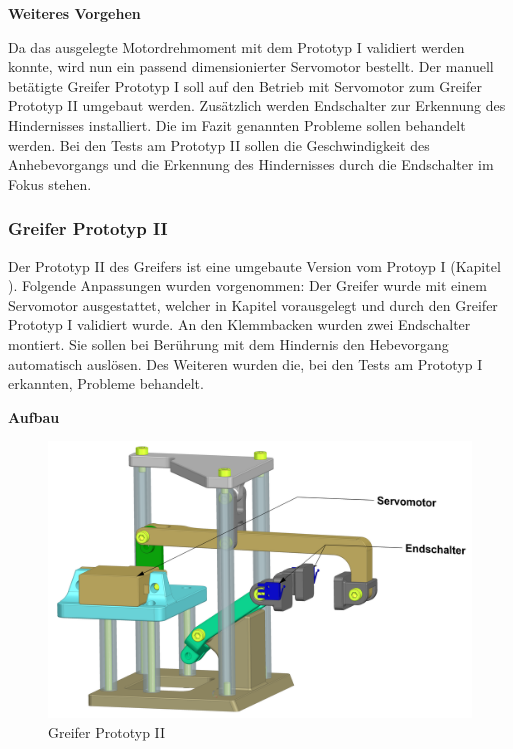 \textbf{Weiteres Vorgehen}

Da das ausgelegte Motordrehmoment mit dem Prototyp I validiert werden konnte, wird nun ein passend dimensionierter Servomotor bestellt. Der manuell betätigte Greifer Prototyp I soll auf den Betrieb mit Servomotor zum Greifer Prototyp II umgebaut werden. Zusätzlich werden Endschalter zur Erkennung des Hindernisses installiert. Die im Fazit genannten Probleme sollen behandelt werden.
Bei den Tests am Prototyp II sollen die Geschwindigkeit des Anhebevorgangs und die Erkennung des Hindernisses durch die Endschalter im Fokus stehen.


\subsubsection*{Greifer Prototyp II}
\label{subsubsection:gripper-prototype-2}


Der Prototyp II des Greifers ist eine umgebaute Version vom Protoyp I (Kapitel ). Folgende Anpassungen wurden vorgenommen: Der Greifer wurde mit einem Servomotor ausgestattet, welcher in Kapitel  vorausgelegt und durch den Greifer Prototyp I validiert wurde. An den Klemmbacken wurden zwei Endschalter montiert. Sie sollen bei Berührung mit dem Hindernis den Hebevorgang automatisch auslösen. Des Weiteren wurden die, bei den Tests am Prototyp I erkannten, Probleme behandelt.

\textbf{Aufbau}

\begin{figure}[H]
\centering
\includegraphics[width=1.0\textwidth]{assets/greifer-prototyp/Greifer_Prototyp_2_trimetrisch.png}
\caption{Greifer Prototyp II}
\label{fig:gripper-prototype-2-trimetric}
\end{figure}

